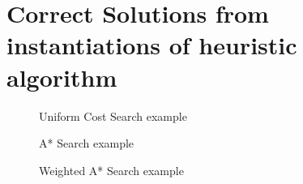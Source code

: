 \section{Correct Solutions from instantiations of heuristic algorithm}

\begin{figure}[H]
	\centering
	\caption{Uniform Cost Search example}
	\label{fig: Uniform Cost Search Path Trace}
\end{figure}

\begin{figure}[H]
	\centering
	\caption{A* Search example}
	\label{fig: A* Search Path Trace}
\end{figure}

\begin{figure}[H]
	\centering
	\caption{Weighted A* Search example}
	\label{fig: Weighted A* Search Path Trace}
\end{figure}